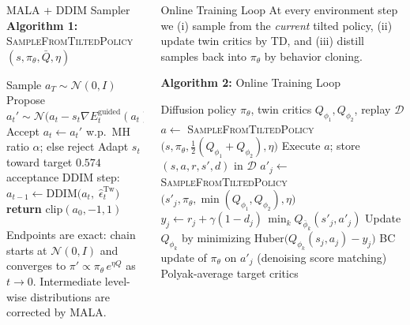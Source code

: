 \documentclass[final,hyperref={pdfpagelabels=false}]{beamer}
\newlength{\colwidth}
\begin{document}
\begin{frame}[t]
\begin{columns}[t]
\begin{column}{\colwidth}
\vspace{0.5cm}

\begin{block}{\Large MALA + DDIM Sampler}
\textbf{Algorithm 1:}\; \textsc{SampleFromTiltedPolicy}$(s,\pi_\theta,\bar Q,\eta)$
\vspace{-0.2em}
\begin{algorithmic}[1]
\STATE Sample $a_T \sim \mathcal{N}(0,I)$
    \STATE Propose $a_t' \sim \mathcal{N}\!\bigl(a_t-s_t\nabla E_t^{\mathrm{guided}}(a_t),\, 2 s_t I\bigr)$
    \STATE Accept $a_t \leftarrow a_t'$ w.p.\ MH ratio $\alpha$; else reject
    \STATE Adapt $s_t$ toward target $0.574$ acceptance
  \ENDFOR
  \STATE DDIM step: $a_{t-1} \leftarrow \mathrm{DDIM}\!\bigl(a_t,\;\hat\epsilon^{\mathrm{Tw}}_t\bigr)$
\ENDFOR
\STATE \textbf{return} $\mathrm{clip}(a_0,-1,1)$
\end{algorithmic}
\vspace{0.2em}
Endpoints are exact: chain starts at $\mathcal{N}(0,I)$ and converges to $\pi'\propto \pi_\theta\,e^{\eta Q}$ as $t\to 0$. Intermediate level-wise distributions are corrected by MALA.
\end{block}

\end{column}

\begin{column}{\colwidth}

\begin{block}{\Large Online Training Loop}
At every environment step we (i) sample from the \emph{current} tilted policy, (ii) update twin critics by TD, and (iii) distill samples back into $\pi_\theta$ by behavior cloning.

\vspace{0.3em}
\textbf{Algorithm 2:}\; Online Training Loop
\vspace{-0.2em}
\begin{algorithmic}[1]
\REQUIRE Diffusion policy $\pi_\theta$, twin critics $Q_{\phi_1},Q_{\phi_2}$, replay $\mathcal{D}$
  \STATE $a \leftarrow$ \textsc{SampleFromTiltedPolicy}$\bigl(s,\pi_\theta,\tfrac{1}{2}(Q_{\phi_1}{+}Q_{\phi_2}),\eta\bigr)$
  \STATE Execute $a$; store $(s,a,r,s',d)$ in $\mathcal{D}$
  \STATE $a'_j \leftarrow$ \textsc{SampleFromTiltedPolicy}$\bigl(s'_j,\pi_\theta,\min(Q_{\phi_1},Q_{\phi_2}),\eta\bigr)$
  \STATE $y_j \leftarrow r_j + \gamma(1{-}d_j)\,\min_k Q_{\bar\phi_k}(s'_j,a'_j)$
  \STATE Update $Q_{\phi_k}$ by minimizing $\mathrm{Huber}\bigl(Q_{\phi_k}(s_j,a_j)-y_j\bigr)$
  \STATE BC update of $\pi_\theta$ on $a'_j$ (denoising score matching)
  \STATE Polyak-average target critics
\ENDFOR
\end{algorithmic}


\end{block}
\end{column}
\end{columns}
\end{frame}
\end{document}
